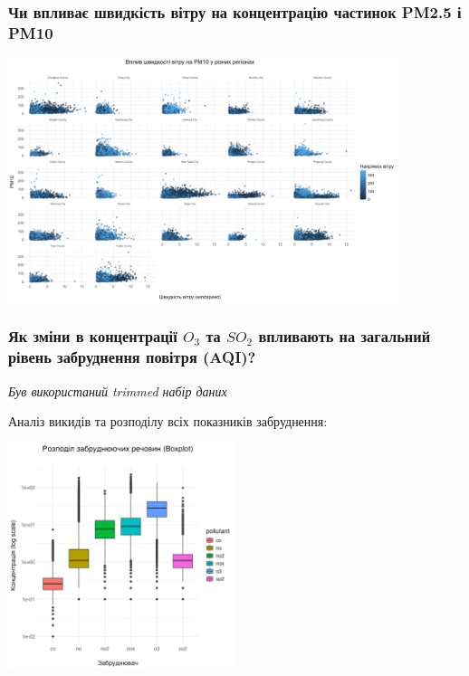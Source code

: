 \documentclass{beamer}
\begin{document}
\begin{frame}
  \frametitle{Чи впливає швидкість вітру на концентрацію частинок PM2.5 і PM10}

  \begin{center}
    \includegraphics[height=2.8in]{plots/question1/scatter_pm10_region.png}

  \end{center}
\end{frame}


\begin{frame}
  \frametitle{Як зміни в концентрації $O_3$ та $SO_2$ впливають на загальний рівень забруднення повітря (AQI)?}

  \textit{Був використаний trimmed набір даних}

  Аналіз викидів та розподілу всіх показників забруднення:

  \begin{center}
    \includegraphics[height=2.6in]{plots/question2/boxplot_pollutants.png}
  \end{center}
\end{frame}
\end{document}
